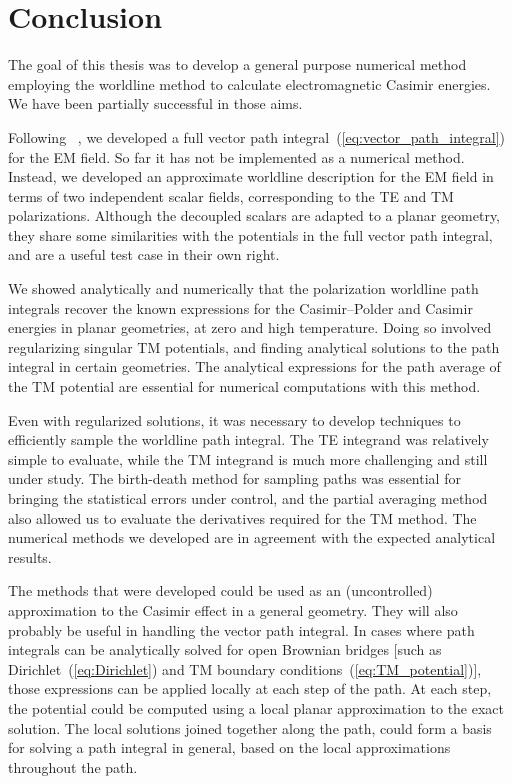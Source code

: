 \chapter{Conclusion}

The goal of this thesis was to develop a general purpose numerical method
employing the worldline method to calculate electromagnetic Casimir energies. 
We have been partially successful in those aims.   %

Following ~\citet{Bordag1998,Bordag1999}, we developed a full vector path integral~(\ref{eq:vector_path_integral}) for
the EM field.  So far it has not be implemented as a numerical method.
Instead, we developed an approximate worldline description for the EM field in terms of two independent scalar fields, corresponding 
to the TE and TM polarizations.   
Although the decoupled scalars are adapted to a planar geometry, 
they share some similarities with the potentials in the full vector
path integral, and are a useful test case in their own right.  

We showed analytically and numerically that the polarization worldline path integrals recover the known expressions for the 
Casimir--Polder and Casimir energies in planar geometries, at zero and high temperature.  
Doing so involved regularizing singular TM potentials, and finding analytical solutions to the path integral
in certain geometries.  The analytical expressions for the path average of the TM potential are 
 essential for numerical computations with this method.  

Even with regularized solutions, it was necessary to develop techniques to efficiently
sample the worldline path integral.  The TE integrand was relatively simple to evaluate, while the TM
integrand is much more challenging and still under study.
The birth-death method for sampling paths was essential for bringing the statistical errors under control, 
and the partial averaging method also allowed us to evaluate the derivatives required for the TM method.
The numerical methods we developed are in agreement with the expected analytical results.

The methods that were developed could be used as an (uncontrolled) approximation to the Casimir effect in a general geometry.
They will also probably be useful in handling the vector path integral.    
In cases where path integrals can be analytically solved for open Brownian bridges [such as
Dirichlet~(\ref{eq:Dirichlet}) and TM boundary conditions~(\ref{eq:TM_potential})], 
those expressions can be applied locally at each step of the path.  
At each step, the potential could be computed using a local planar approximation to the exact solution.
The local solutions joined together along the path, could form a basis for solving a path integral
in general, based on the local approximations throughout the path.  


